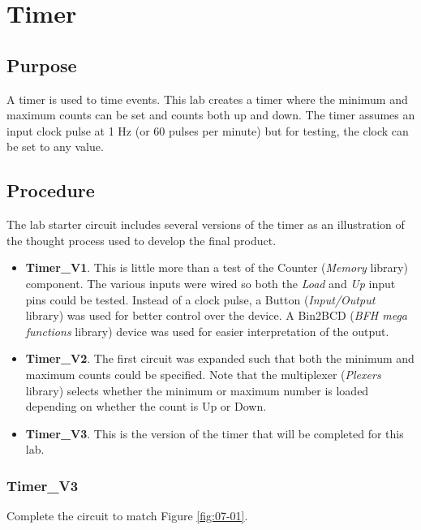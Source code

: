 \chapter{Timer}

\section{Purpose}

A timer is used to time events. This lab creates a timer where the minimum and maximum counts can be set and counts both up and down. The timer assumes an input clock pulse at 1 Hz (or 60 pulses per minute) but for testing, the clock can be set to any value.

\section{Procedure}

The lab starter circuit includes several versions of the timer as an illustration of the thought process used to develop the final product.

\begin{itemize}
	\item \textbf{Timer\_V1}. This is little more than a test of the Counter (\textit{Memory} library) component. The various inputs were wired so both the \textit{Load} and \textit{Up} input pins could be tested. Instead of a clock pulse, a Button (\textit{Input/Output} library) was used for better control over the device. A Bin2BCD (\textit{BFH mega functions} library) device was used for easier interpretation of the output.
	\item \textbf{Timer\_V2}. The first circuit was expanded such that both the minimum and maximum counts could be specified. Note that the multiplexer (\textit{Plexers} library) selects whether the minimum or maximum number is loaded depending on whether the count is Up or Down.
	\item \textbf{Timer\_V3}. This is the version of the timer that will be completed for this lab.
\end{itemize}

\subsection{Timer\_V3}

Complete the circuit to match Figure \ref{fig:07-01}.

